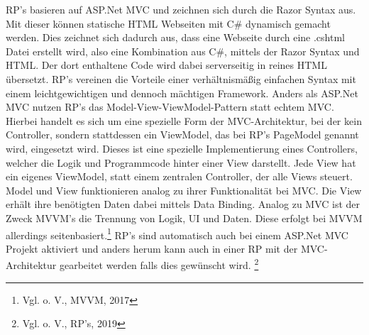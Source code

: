 \documentclass[a4paper,
12pt,
oneside]
{article}
\begin{document}
	RP's basieren auf ASP.Net MVC und zeichnen sich durch die Razor Syntax aus. Mit dieser können statische HTML Webseiten mit C\# dynamisch gemacht werden. Dies zeichnet sich dadurch aus, dass eine Webseite durch eine .cshtml Datei erstellt wird, also eine Kombination aus C\#, mittels der Razor Syntax und HTML. Der dort enthaltene Code wird dabei serverseitig in reines HTML übersetzt. RP's vereinen die Vorteile einer verhältnismäßig einfachen Syntax mit einem leichtgewichtigen und dennoch mächtigen Framework. Anders als ASP.Net MVC nutzen RP's das Model-View-ViewModel-Pattern statt echtem MVC. Hierbei handelt es sich um eine spezielle Form der MVC-Architektur, bei der kein Controller, sondern stattdessen ein ViewModel, das bei RP's PageModel genannt wird, eingesetzt wird. Dieses ist eine spezielle Implementierung eines Controllers, welcher die Logik und Programmcode hinter einer View darstellt. Jede View hat ein eigenes ViewModel, statt einem zentralen Controller, der alle Views steuert. Model und View funktionieren analog zu ihrer Funktionalität bei MVC. Die View erhält ihre benötigten Daten dabei mittels Data Binding. Analog zu MVC ist der Zweck MVVM's die Trennung von Logik, UI und Daten. Diese erfolgt bei MVVM allerdings seitenbasiert.\footnote{Vgl. o. V., MVVM, 2017} RP's sind automatisch auch bei einem ASP.Net MVC Projekt aktiviert und anders herum kann auch in einer RP mit der MVC-Architektur gearbeitet werden falls dies gewünscht wird. \footnote{Vgl. o. V., RP's, 2019}
	
\end{document}

